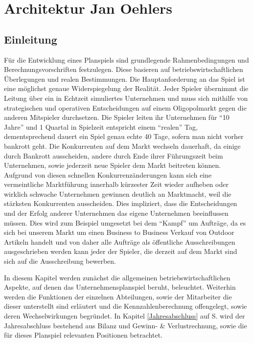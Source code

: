 \chapter{Architektur \textnormal{\textsf{\small{Jan Oehlers}}}}
\section{Einleitung}
Für die Entwicklung eines Planspiels sind grundlegende Rahmenbedingungen und Berechnungsvorschriften festzulegen. Diese basieren auf betriebswirtschaftlichen Überlegungen und realen Bestimmungen. Die Hauptanforderung an das Spiel ist eine möglichst genaue Widerspiegelung der Realität. Jeder Spieler übernimmt die Leitung über ein in Echtzeit simuliertes Unternehmen und muss sich mithilfe von strategischen und operativen Entscheidungen auf einem Oligopolmarkt gegen die anderen Mitspieler durchsetzen. Die Spieler leiten ihr Unternehmen für \enquote{10 Jahre} und 1 Quartal in Spielzeit entspricht einem \enquote{realen} Tag, dementsprechend dauert ein Spiel genau echte 40 Tage, sofern man nicht vorher bankrott geht. Die Konkurrenten auf dem Markt wechseln dauerhaft, da einige durch Bankrott ausscheiden, andere durch Ende ihrer Führungszeit beim Unternehmen, sowie jederzeit neue Spieler dem Markt beitreten können. Aufgrund von diesen schnellen Konkurrenzänderungen kann sich eine vermeintliche Marktführung innerhalb kürzester Zeit wieder aufheben oder wirklich schwache Unternehmen gewinnen deutlich an Marktmacht, weil die stärksten Konkurrenten ausscheiden. Dies impliziert, dass die Entscheidungen und der Erfolg anderer Unternehmen das eigene Unternehmen beeinflussen müssen. Dies wird zum Beispiel umgesetzt bei dem \enquote{Kampf} um Aufträge, da es sich bei unserem Markt um einen Business to Business Verkauf von Outdoor Artikeln handelt und von daher alle Aufträge als öffentliche Ausschreibungen ausgeschrieben werden kann jeder der Spieler, die derzeit auf dem Markt sind sich auf die Ausschreibung bewerben.

In diesem Kapitel werden zunächst die allgemeinen betriebswirtschaftlichen Aspekte, auf denen das Unternehmensplanspiel beruht, beleuchtet. Weiterhin werden die Funktionen der einzelnen Abteilungen, sowie der Mitarbeiter die dieser unterstellt sind erläutert und die Kennzahlenberechnung offengelegt, sowie deren Wechselwirkungen begründet. In Kapitel \ref{Jahresabschluss} auf S.\pageref{Jahresabschluss}  wird der Jahresabschluss bestehend aus Bilanz und Gewinn- \& Verlustrechnung, sowie die für dieses Planspiel relevanten Positionen betrachtet. 

